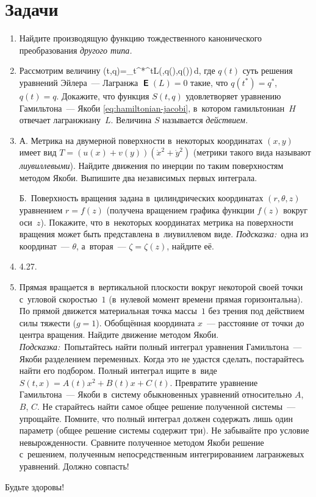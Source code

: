 \documentclass[a4paper,11pt]{article}
\def\[#1\]{\begin{align*}#1\end{align*}}
\theoremstyle{definition}
\begin{document}
\section{Задачи}

\begin{enumerate}

\item
Найдите производящую функцию тождественного канонического преобразования
\emph{другого типа.}

\item
Рассмотрим величину
	\[
	S(t,q)=\int_{t^*}^tL(\theta,q(\theta),\dot q(\theta))\,d\theta,
	\]
где $q(t)$ суть решения уравнений Эйлера~— Лагранжа $\mbfsansE(L)=0$ такие, что
$q(t^*)=q^*$, $q(t)=q$. Докажите, что функция $S(t,q)$ удовлетворяет уравнению
Гамильтона~— Якоби \eqref{eq:hamiltonian-jacobi}, в~котором гамильтониан~$H$
отвечает лагранжиану~$L$. Величина $S$ называется \emph{действием.}

\item\label{prb:2}
А. Метрика на двумерной поверхности в~некоторых координатах $(x,y)$ имеет вид
$T=(u(x)+v(y))(\dot x^2+\dot y^2)$ (метрики такого вида называют
\emph{лиувиллевыми}). Найдите движения по инерции по таким поверхностям методом
Якоби. Выпишите два независимых первых интеграла.

Б.~Поверхность вращения задана в~цилиндрических координатах $(r,\theta,z)$
уравнением $r=f(z)$ (получена вращением графика функции $f(z)$ вокруг оси~$z$).
Покажите, что в~некоторых координатах метрика на поверхности вращения может
быть представлена в~лиувиллевом виде. \emph{Подсказка:\/}~одна из
координат~— $\theta$, а~вторая~— $\zeta=\zeta(z)$, найдите её.

\item\label{prb:3}
4.27.

\item
Прямая вращается в~вертикальной плоскости вокруг некоторой своей точки
с~угловой скоростью~$1$ (в~нулевой момент времени прямая горизонтальна). По
прямой движется материальная точка массы~$1$ без трения под действием силы
тяжести ($g=1$). Обобщённая координата $x$~— расстояние от точки до центра
вращения. Найдите движение методом Якоби. \emph{Подсказка:\/}~Попытайтесь найти
полный интеграл уравнения Гамильтона~— Якоби разделением переменных. Когда это
не удастся сделать, постарайтесь найти его подбором. Полный интеграл ищите
в~виде $S(t,x)=A(t)x^2+B(t)x+C(t)$. Превратите уравнение Гамильтона~— Якоби
в~систему обыкновенных уравнений относительно $A$, $B$, $C$. Не старайтесь
найти самое общее решение полученной системы~— упрощайте. Помните, что полный
интеграл должен содержать лишь один параметр (общее решение системы содержит
три). Не забывайте про условие невырожденности. Сравните полученное методом
Якоби решение с~решением, полученным непосредственным интегрированием
лагранжевых уравнений. Должно совпасть!


\end{enumerate}

Будьте здоровы!
\end{document}
